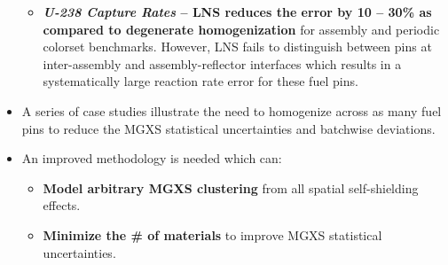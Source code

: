 \begin{highlightsbox}[frametitle=Highlights]
\begin{itemize}
\begin{itemize}
    \item \textbf{\textit{U-238 Capture Rates} -- \ac{LNS} reduces the error by 10 -- 30\% as compared to degenerate homogenization} for assembly and periodic colorset benchmarks. However, \ac{LNS} fails to distinguish between pins at inter-assembly and assembly-reflector interfaces which results in a systematically large reaction rate error for these fuel pins.
  \end{itemize}
  \item A series of case studies illustrate the need to homogenize across as many fuel pins to reduce the \ac{MGXS} statistical uncertainties and batchwise deviations.
  \item An improved methodology is needed which can:
  \begin{itemize}  
     \item \textbf{Model arbitrary \ac{MGXS} clustering} from all spatial self-shielding effects.
     \item \textbf{Minimize the \# of materials} to improve \ac{MGXS} statistical uncertainties.
   \end{itemize}
\end{itemize}
\end{highlightsbox}
\vfill
